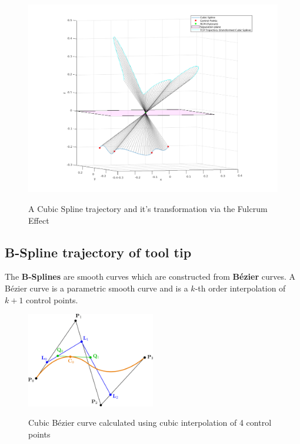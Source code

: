 \begin{center}
\begin{figure}[htbp]
\centering
\includegraphics[width=\textwidth]{images/rcm_trajectories/rcm_cubic_traj.png}\\
\caption{A Cubic Spline trajectory and it's transformation via the Fulcrum Effect}
\end{figure}
\end{center}


\subsection{B-Spline trajectory of tool tip}
\label{section:b-spline}

The \textbf{B-Splines} are smooth curves which are constructed from \textbf{B\'ezier} curves. A B\'ezier curve is a parametric smooth curve and is a $k$-th order interpolation of $k+1$ control points.

\begin{center}
\begin{figure}[htbp]
\centering
\includegraphics[width=0.5\textwidth]{images/bezier-curve.png}\\
\caption{Cubic B\'ezier curve calculated using cubic interpolation of 4 control points} 
\end{figure}
\end{center}

